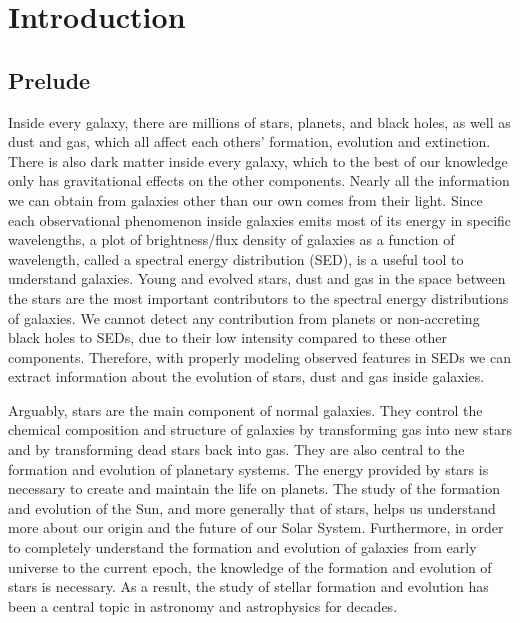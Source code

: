 \chapter{Introduction}
\label{chap:intro}

\section{Prelude}
\label{sec: overview}
Inside every galaxy, there are millions of stars, planets, and black holes, as well as dust and gas, which all affect each others' formation, evolution and extinction.
There is also dark matter inside every galaxy, which to the best of our knowledge only has gravitational effects on the other components.
Nearly all the information we can obtain from galaxies other than our own comes from their light.
Since each observational phenomenon inside galaxies emits most of its energy in specific wavelengths, 
a plot of brightness/flux density of galaxies as a function of wavelength, called a spectral energy distribution (SED), is a useful tool to understand galaxies. 
Young and evolved stars, dust and gas in the space between the stars are the most important contributors to the spectral energy distributions of galaxies.
We cannot detect any contribution from planets or non-accreting black holes to SEDs, due to their low intensity compared to these other components.
Therefore, with properly modeling observed features in SEDs we can extract information about the evolution of stars, dust and gas inside galaxies.

Arguably, stars are the main component of normal galaxies.
They control the chemical composition and structure of galaxies by transforming gas into new stars and by transforming dead stars back into gas.
They are also central to the formation and evolution of planetary systems.
The energy provided by stars is necessary to create and maintain the life on planets. 
The study of the formation and evolution of the Sun, and more generally that of stars, helps us understand more about our origin and the future of our Solar System.
Furthermore, in order to completely understand the formation and evolution of galaxies from early universe to the current epoch, the knowledge of the formation and evolution of stars is necessary. 
As a result, the study of stellar formation and evolution has been a central topic in astronomy and astrophysics for decades.

